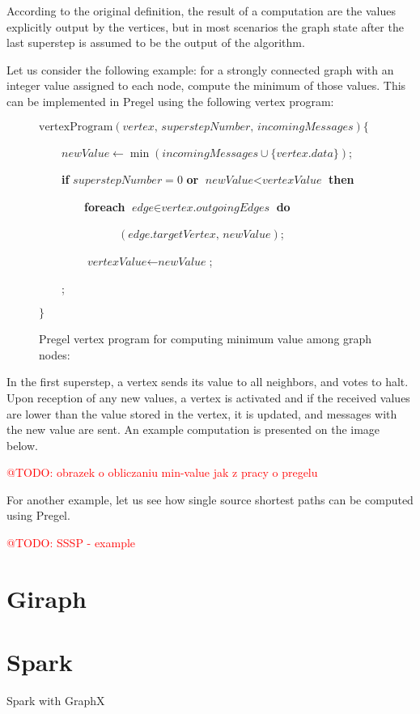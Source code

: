 \documentclass{pracamgr}
\makeatletter
\theoremstyle{plain}
\theoremstyle{definition}
\theoremstyle{remark}
\newcommand{\todo}[1]{\textcolor{red}{@TODO: #1}}
\makeatother
\begin{document}
According to the original definition, the result of a computation are the values explicitly output by the vertices, but in most scenarios the graph state after the last superstep is assumed to be the output of the algorithm.

Let us consider the following example: for a strongly connected graph with an integer value assigned to each node, compute the minimum of those values. This can be implemented in Pregel using the following vertex program:

\begin{figure}[h!]
\parbox{0.8\textwidth}{
$\text{vertexProgram}(\textit{vertex, superstepNumber, incomingMessages}) \{$

~~~~$\textit{newValue} \leftarrow \min(\textit{incomingMessages} \cup \{\textit{vertex.data}\})$;

~~~~\textbf{if} $superstepNumber = 0$ \textbf{or} $\textit{newValue} < \textit{vertexValue}$ \textbf{then}

~~~~~~~~\textbf{foreach} $\textit{edge} \in \textit{vertex.outgoingEdges}$ \textbf{do}

~~~~~~~~~~~~~~$(\textit{edge.targetVertex, newValue})$;

~~~~~~~~$\textit{vertexValue} \leftarrow \textit{newValue}$;

~~~~;

$\}$
}
\caption{Pregel vertex program for computing minimum value among graph nodes:}
\end{figure}

In the first superstep, a vertex sends its value to all neighbors, and votes to halt. Upon reception of any new values, a vertex is activated and if the received values are lower than the value stored in the vertex, it is updated, and messages with the new value are sent. An example computation is presented on the image below.

\todo{obrazek o obliczaniu min-value jak z pracy o pregelu}

For another example, let us see how single source shortest paths can be computed using Pregel.

\todo{SSSP - example}

\section{Giraph}

\section{Spark}
Spark with GraphX
\end{document}
